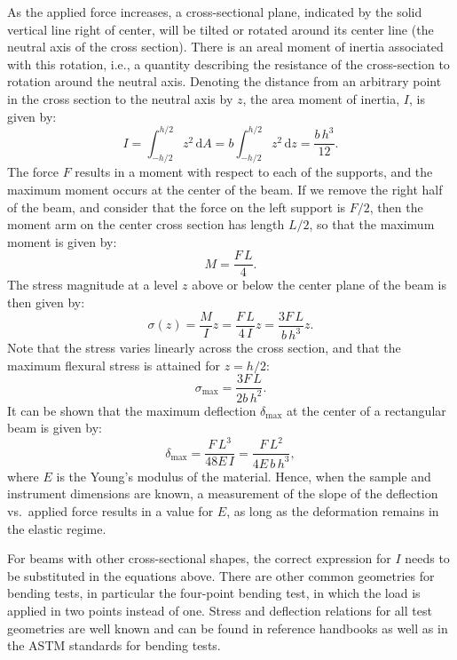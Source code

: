 As the applied force increases, a cross-sectional plane, indicated by the solid vertical line right of center, will be tilted or rotated around its center line (the neutral axis of the cross section). There is an areal moment of inertia associated with this rotation, i.e., a quantity describing the resistance of the cross-section to rotation around the neutral axis.  Denoting the distance from an arbitrary point in the cross section to the neutral axis by $z$, the area moment of inertia, $I$, is given by:
\[
	I = \int_{-h/2}^{h/2} z^2\, \mathrm{d}A = b\int_{-h/2}^{h/2} z^2\,\mathrm{d}z = \frac{b\,h^3}{12}.
\]
The force $F$ results in a moment with respect to each of the supports, and the maximum moment occurs at the center of the beam. If we remove the right half of the beam, and consider that the force on the left support is $F/2$, then the moment arm on the center cross section has length $L/2$, so that the maximum moment is given by:
\[
	M = \frac{F\, L}{4}.
\]
The stress magnitude at a level $z$ above or below the center plane of the beam is then given by:
\[
	\sigma(z) = \frac{M}{I}z = \frac{F\,L}{4\,I}z = \frac{3F\,L}{b\,h^3}z.
\]
Note that the stress varies linearly across the cross section, and that the maximum flexural stress is attained for $z=h/2$:
\[
	\sigma_{\text{max}} = \frac{3F\, L}{2b\,h^2}.
\]
It can be shown that the maximum deflection $\delta_{\text{max}}$ at the center of a rectangular beam is given by:
\[
	\delta_{\text{max}} = \frac{F\,L^3}{48E\,I} = \frac{F\,L^2}{4E\,b\,h^3},
\]
where $E$ is the Young's modulus of the material.  Hence, when the sample and instrument dimensions are known, a measurement of the slope of the deflection vs.\ applied force results in a value for $E$, as long as the deformation remains in the elastic regime.  

For beams with other cross-sectional shapes, the correct expression for $I$ needs to be substituted in the equations above.  There are other common geometries for bending tests, in particular the four-point bending test, in which the load is applied in two points instead of one.  Stress and deflection relations for all test geometries are well known and can be found in reference handbooks as well as in the ASTM standards for bending tests.

